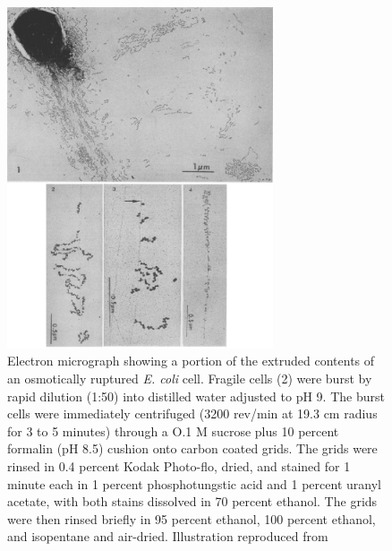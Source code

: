 \begin{figure}[!ht]
  \centering
  \includegraphics[width=0.7\textwidth]{introduction/chapter/figs/miller.png}
  \caption{Electron micrograph showing a portion of the extruded contents of an osmotically ruptured \textit{E. coli} cell. Fragile cells (2) were burst by rapid dilution (1:50) into distilled water adjusted to pH 9. The burst cells were immediately centrifuged (3200 rev/min at 19.3 cm radius for 3 to 5 minutes) through a O.1 M sucrose plus 10 percent formalin (pH 8.5) cushion onto carbon coated grids. The grids were rinsed in 0.4 percent Kodak Photo-flo, dried, and stained for 1 minute each in 1 percent phosphotungstic acid and 1 percent uranyl acetate, with both stains dissolved in 70 percent ethanol. The grids were then rinsed briefly in 95 percent ethanol, 100 percent ethanol, and isopentane and air-dried. Illustration reproduced from \citet{miller1970visualization}}
  \label{fig.intro7}
\end{figure}

